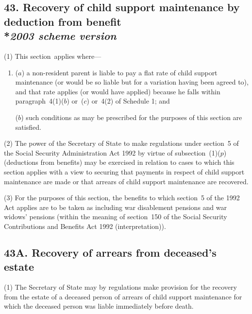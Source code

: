 \documentclass[12pt,a4paper]{article}
\begin{document}
\subsection[43. Recovery of child support maintenance by deduction from benefit --- \emph{2003 scheme version}]{43. Recovery of child support maintenance by deduction from benefit\\*\emph{2003 scheme version}}

(1) This section~applies where—
\begin{enumerate}\item[]
($a$) a non-resident parent is liable to pay a flat rate of child support maintenance (or would be so liable but for a variation having been agreed to), and that rate applies (or would have applied) because he falls within paragraph~4(1)($b$)  or~($c$)  or~4(2)  of Schedule 1; and

($b$) such conditions as may be prescribed for the purposes of this section are satisfied.
\end{enumerate}

(2) The power of the Secretary of State to make regulations under section~5 of the Social Security Administration Act 1992 by virtue of subsection~(1)($p$)  (deductions from benefits) may be exercised in relation to cases to which this section applies with a view to securing that payments in respect of child support maintenance are made or that arrears of child support maintenance are recovered.

(3) For the purposes of this section, the benefits to which section~5 of the 1992 Act applies are to be taken as including war disablement pensions and war widows' pensions (within the meaning of section~150 of the Social Security Contributions and Benefits Act 1992 (interpretation)).


\subsection{43A. Recovery of arrears from deceased's estate}

(1) The Secretary of State may by regulations make provision for the recovery from the estate of a deceased person of arrears of child support maintenance for which the deceased person was liable immediately before death.
\end{document}
